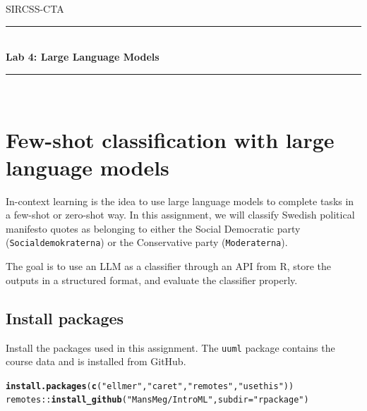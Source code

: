 \documentclass[11pt,a4paper,english]{article}\usepackage[]{graphicx}\usepackage[]{xcolor}
\makeatletter
\newcommand{\hlsng}[1]{\textcolor[rgb]{0.192,0.494,0.8}{#1}}%
\newcommand{\hlopt}[1]{\textcolor[rgb]{0,0,0}{#1}}%
\newcommand{\hldef}[1]{\textcolor[rgb]{0.345,0.345,0.345}{#1}}%
\newcommand{\hlkwc}[1]{\textcolor[rgb]{0.333,0.667,0.333}{#1}}%
\newcommand{\hlkwd}[1]{\textcolor[rgb]{0.737,0.353,0.396}{\textbf{#1}}}%
\newenvironment{kframe}{%
 \def\at@end@of@kframe{}%
 \ifinner\ifhmode%
  \def\at@end@of@kframe{\end{minipage}}%
  \begin{minipage}{\columnwidth}%
 \fi\fi%
 \def\FrameCommand##1{\hskip\@totalleftmargin \hskip-\fboxsep
 \colorbox{shadecolor}{##1}\hskip-\fboxsep
     \hskip-\linewidth \hskip-\@totalleftmargin \hskip\columnwidth}%
 \MakeFramed {\advance\hsize-\width
   \@totalleftmargin\z@ \linewidth\hsize
   \@setminipage}}%
 {\par\unskip\endMakeFramed%
 \at@end@of@kframe}
\newenvironment{knitrout}{}{} %
\newcommand{\HRule}{\rule{\linewidth}{0.5mm}}
\makeatother
\begin{document}

\begin{titlepage}

\center
\textsc{\LARGE SIRCSS-CTA}\\[1.5cm] %

\HRule \\[0.4cm]
{ \huge \bfseries Lab 4: Large Language Models}\\[0.4cm] %
\HRule \\[1.5cm]

\vfill

\end{titlepage}





\section{Few-shot classification with large language models}

In-context learning is the idea to use large language models to complete tasks in a few-shot or zero-shot way. In this assignment, we will classify Swedish political manifesto quotes as belonging to either the Social Democratic party (\texttt{Socialdemokraterna}) or the Conservative party (\texttt{Moderaterna}).

The goal is to use an LLM as a classifier through an API from R, store the outputs in a structured format, and evaluate the classifier properly.

\subsection{Install packages}

Install the packages used in this assignment. The \texttt{uuml} package contains the course data and is installed from GitHub.

\begin{knitrout}\small
{}\color{fgcolor}\begin{kframe}
\begin{alltt}
\hlkwd{install.packages}\hldef{(}\hlkwd{c}\hldef{(}\hlsng{"ellmer"}\hldef{,} \hlsng{"caret"}\hldef{,} \hlsng{"remotes"}\hldef{,} \hlsng{"usethis"}\hldef{))}
\hldef{remotes}\hlopt{::}\hlkwd{install_github}\hldef{(}\hlsng{"MansMeg/IntroML"}\hldef{,} \hlkwc{subdir} \hldef{=} \hlsng{"rpackage"}\hldef{)}
\end{alltt}
\end{kframe}
\end{knitrout}
\end{document}
